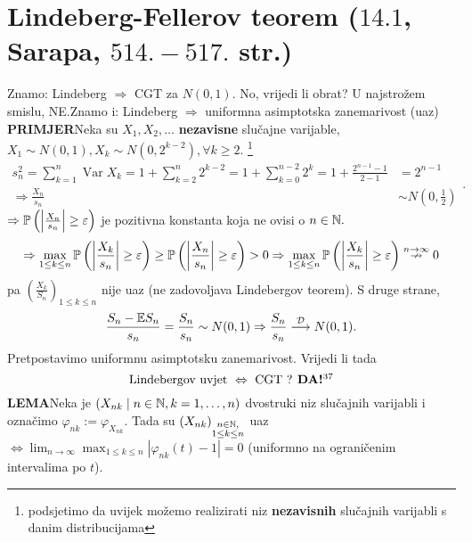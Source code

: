 \documentclass{article}
\newcommand{\Var}{\operatorname{Var}}
\begin{document}
\section{Lindeberg-Fellerov teorem (\textsection \(14.1\), Sarapa, \(514.-517.\) str.)}
Znamo: Lindeberg \(\Rightarrow\) CGT za \(N(0,1).\) No, vrijedi li obrat? U najstrožem smislu, NE.\newline Znamo i: Lindeberg \(\Rightarrow\) uniformna asimptotska zanemarivost (uaz)\newline\newline
\textbf{PRIMJER}\newline Neka su \(X_1,X_2,\ldots\) \textbf{nezavisne} slučajne varijable, \(X_1\sim N(0,1), X_k\sim N\left(0,2^{k-2}\right),\forall k\ge 2.\) \footnote[36]{podsjetimo da uvijek možemo realizirati niz \textbf{nezavisnih} slučajnih varijabli s danim distribucijama}\[\begin{aligned}s_n^2=\sum_{k=1}^n\Var X_k=1+\sum_{k=2}^n2^{k-2}=1+\sum_{k=0}^{n-2}2^k=1+\frac{2^{n-1}-1}{2-1}&=2^{n-1}\\\Rightarrow \frac{X_n}{s_n}&\sim N\left(0,\frac12\right)\end{aligned}.\]   \(\Rightarrow\Bbb P\left(\left|\frac{X_n}{s_n}\right|\ge\varepsilon\right)\) je pozitivna konstanta koja ne ovisi o \(n\in\Bbb N.\) \[\Rightarrow\max_{1\le k\le n}\Bbb P\left(\left|\frac{X_k}{s_n}\right|\ge\varepsilon\right)\ge\Bbb P\left(\left|\frac{X_n}{s_n}\right|\ge\varepsilon\right)>0\Rightarrow \max_{1\le k\le n}\Bbb P\left(\left|\frac{X_k}{s_n}\right|\ge\varepsilon\right)\overset{n\to\infty}{\nrightarrow}0\] pa \(\left(\frac{X_k}{S_n}\right)_{1\le k\le n}\) nije uaz (ne zadovoljava Lindebergov teorem). S druge strane, \[\frac{S_n-\Bbb ES_n}{s_n}=\frac{S_n}{s_n}\sim N(0,1)\Rightarrow\frac{S_n}{s_n}\overset{\mathcal D}{\longrightarrow}N(0,1).\]  
Pretpostavimo uniformnu asimptotsku zanemarivost. Vrijedi li tada \[\text{Lindebergov uvjet }\Leftrightarrow\text{ CGT }?\textbf{ DA!}\footnotemark[37]\]
\textbf{LEMA}\newline Neka je \((X_{nk}\mid n\in\Bbb N, k=1,\ldots,n)\) dvostruki niz slučajnih varijabli i označimo \(\varphi_{nk}:=\varphi_{X_{nk}}.\) Tada su \((X_{nk})_{\substack{n\in\Bbb N,\\1\le k\le n}}\) uaz \(\Leftrightarrow\displaystyle\lim_{n\to\infty}\max_{1\le k\le n}\left|\varphi_{nk}(t)-1\right|=0\) (uniformno na ograničenim intervalima po \(t\)).\newline\newline
\end{document}
